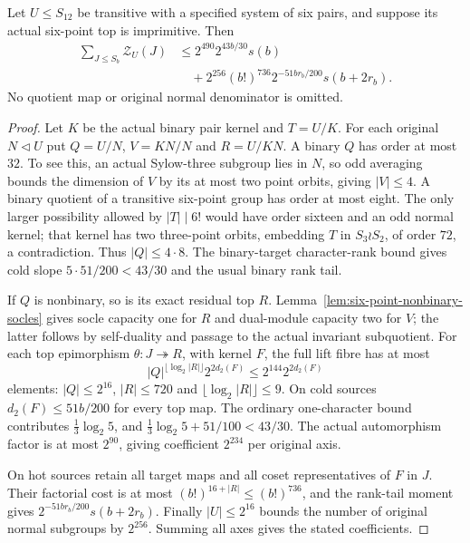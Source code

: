 \begin{proposition}\label{prop:uniform-six-pair-source}
Let $U\leq S_{12}$ be transitive with a specified system of six pairs,
and suppose its actual six-point top is imprimitive. Then
\begin{align*}
 \sum_{J\leq S_b}\mathcal Z_U(J)
 &\leq 2^{490}2^{43b/30}s(b)\\
 &\quad+2^{256}(b!)^{736}2^{-51br_b/200}s(b+2r_b).
\end{align*}
No quotient map or original normal denominator is omitted.
\end{proposition}
\begin{proof}
Let $K$ be the actual binary pair kernel and $T=U/K$.
For each original $N\lhd U$ put $Q=U/N$, $V=KN/N$ and $R=U/KN$.
A binary $Q$ has order at most $32$. To see this, an actual Sylow-three
subgroup lies in $N$, so odd averaging bounds the dimension of $V$
by its at most two point orbits, giving $|V|\leq4$.
A binary quotient of a transitive six-point group has order at most
eight. The only larger possibility allowed by $|T|\mid6!$ would have
order sixteen and an odd normal kernel; that kernel has two three-point
orbits, embedding $T$ in $S_3\wr S_2$, of order $72$, a contradiction.
Thus $|Q|\leq4\cdot8$. The binary-target character-rank bound gives
cold slope $5\cdot51/200<43/30$ and the usual binary rank tail.

If $Q$ is nonbinary, so is its exact residual top $R$.
Lemma~\ref{lem:six-point-nonbinary-socles} gives socle capacity one for
$R$ and dual-module capacity two for $V$; the latter follows by
self-duality and passage to the actual invariant subquotient.
For each top epimorphism $\theta:J\twoheadrightarrow R$, with kernel
$F$, the full lift fibre has at most
\[
 |Q|^{\lfloor\log_2|R|\rfloor}2^{2d_2(F)}
 \leq2^{144}2^{2d_2(F)}
\]
elements: $|Q|\leq2^{16}$, $|R|\leq720$ and
$\lfloor\log_2|R|\rfloor\leq9$.
On cold sources $d_2(F)\leq51b/200$ for every top map.
The ordinary one-character bound contributes $\frac13\log_2 5$,
and $\frac13\log_2 5+51/100<43/30$.
The actual automorphism factor is at most $2^{90}$, giving coefficient
$2^{234}$ per original axis.

On hot sources retain all target maps and all coset representatives
of $F$ in $J$. Their factorial cost is at most
$(b!)^{16+|R|}\leq(b!)^{736}$, and the rank-tail moment gives
$2^{-51br_b/200}s(b+2r_b)$.
Finally $|U|\leq2^{16}$ bounds the number of original normal subgroups
by $2^{256}$. Summing all axes gives the stated coefficients.
\end{proof}

